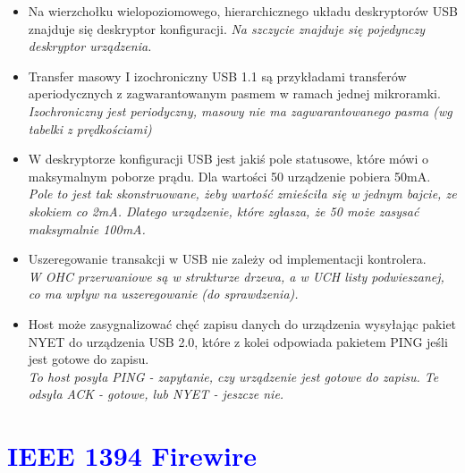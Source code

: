 \begin{itemize}
	\item \textcolor{nie}{Na wierzchołku wielopoziomowego, hierarchicznego układu deskryptorów USB znajduje się deskryptor konfiguracji.}
	{\small \emph{Na szczycie znajduje się pojedynczy deskryptor urządzenia.}}
	
	\item \textcolor{nie}{Transfer masowy I izochroniczny USB 1.1 są przykładami transferów aperiodycznych z zagwarantowanym pasmem w ramach jednej mikroramki.} \\
	{\small \emph{Izochroniczny jest periodyczny, masowy nie ma zagwarantowanego pasma (wg tabelki z	prędkościami)}}
	
	\item \textcolor{nie}{W deskryptorze konfiguracji USB jest jakiś pole statusowe, które mówi o maksymalnym poborze prądu. Dla wartości 50 urządzenie pobiera 50mA.} \\
	{\small \emph{Pole to jest tak skonstruowane, żeby wartość zmieściła się w jednym bajcie, ze skokiem co 2mA. Dlatego urządzenie, które zgłasza, że 50 może zasysać maksymalnie 100mA.}}
	
	\item \textcolor{nie}{Uszeregowanie transakcji w USB nie zależy od implementacji kontrolera.} \\
	{\small \emph{W OHC przerwaniowe są w strukturze drzewa, a w UCH listy podwieszanej, co ma wpływ na uszeregowanie (do sprawdzenia).}}
	
	\item \textcolor{nie}{Host może zasygnalizować chęć zapisu danych do urządzenia wysyłając pakiet NYET do urządzenia USB 2.0, które z kolei odpowiada pakietem PING jeśli jest gotowe do zapisu.} \\
	{\small \emph{To host posyła PING - zapytanie, czy urządzenie jest gotowe do zapisu. Te odsyła ACK - gotowe, lub NYET - jeszcze nie.}}
	
\end{itemize}

\section{\textcolor{blue}{IEEE 1394 Firewire}}
